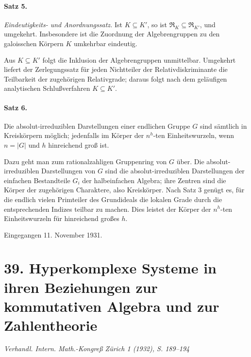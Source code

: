 \documentclass[11pt]{article}
\begin{document}
\paragraph{Satz 5.}
\emph{Eindeutigkeits- und Anordnungssatz.} Ist \(K\subseteq K'\), so ist \(\mathfrak R_K\subseteq\mathfrak R_{K'}\), und umgekehrt. Insbesondere ist die Zuordnung der Algebrengruppen zu den galoisschen Körpern \(K\) umkehrbar eindeutig.

Aus \(K\subseteq K'\) folgt die Inklusion der Algebrengruppen unmittelbar. Umgekehrt liefert der Zerlegungssatz für jeden Nichtteiler der Relativdiskriminante die Teilbarkeit der zugehörigen Relativgrade; daraus folgt nach dem geläufigen analytischen Schlußverfahren \(K\subseteq K'\).

\paragraph{Satz 6.}
Die absolut-irreduziblen Darstellungen einer endlichen Gruppe \(G\) sind sämtlich in Kreiskörpern möglich; jedenfalls im Körper der \(n^h\)-ten Einheitswurzeln, wenn \(n=|G|\) und \(h\) hinreichend groß ist.

Dazu geht man zum rationalzahligen Gruppenring von \(G\) über. Die absolut-irreduziblen Darstellungen von \(G\) sind die absolut-irreduziblen Darstellungen der einfachen Bestandteile \(G_i\) der halbeinfachen Algebra; ihre Zentren sind die Körper der zugehörigen Charaktere, also Kreiskörper. Nach Satz 3 genügt es, für die endlich vielen Primteiler des Grundideals die lokalen Grade durch die entsprechenden Indizes teilbar zu machen. Dies leistet der Körper der \(n^h\)-ten Einheitswurzeln für hinreichend großes \(h\).

\begin{center}
Eingegangen 11. November 1931.
\end{center}

\section*{39. Hyperkomplexe Systeme in ihren Beziehungen zur kommutativen Algebra und zur Zahlentheorie}

\begin{center}
\emph{Verhandl. Intern. Math.-Kongreß Zürich 1 (1932), S. 189--194}
\end{center}
\end{document}
